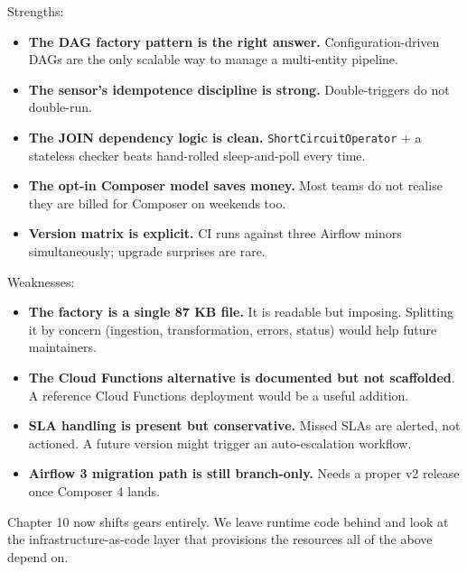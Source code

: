 \documentclass[
  11pt,
  british,
  oneside]{book}
\providecommand{\tightlist}{%
  \setlength{\itemsep}{0pt}\setlength{\parskip}{0pt}}
\begin{document}
Strengths:

\begin{itemize}
\tightlist
\item
  \textbf{The DAG factory pattern is the right answer.}
  Configuration-driven DAGs are the only scalable way to manage a
  multi-entity pipeline.
\item
  \textbf{The sensor's idempotence discipline is strong.}
  Double-triggers do not double-run.
\item
  \textbf{The JOIN dependency logic is clean.}
  \texttt{ShortCircuitOperator} + a stateless checker beats hand-rolled
  sleep-and-poll every time.
\item
  \textbf{The opt-in Composer model saves money.} Most teams do not
  realise they are billed for Composer on weekends too.
\item
  \textbf{Version matrix is explicit.} CI runs against three Airflow
  minors simultaneously; upgrade surprises are rare.
\end{itemize}

Weaknesses:

\begin{itemize}
\tightlist
\item
  \textbf{The factory is a single 87 KB file.} It is readable but
  imposing. Splitting it by concern (ingestion, transformation, errors,
  status) would help future maintainers.
\item
  \textbf{The Cloud Functions alternative is documented but not
  scaffolded}. A reference Cloud Functions deployment would be a useful
  addition.
\item
  \textbf{SLA handling is present but conservative.} Missed SLAs are
  alerted, not actioned. A future version might trigger an
  auto-escalation workflow.
\item
  \textbf{Airflow 3 migration path is still branch-only.} Needs a proper
  v2 release once Composer 4 lands.
\end{itemize}

Chapter 10 now shifts gears entirely. We leave runtime code behind and
look at the infrastructure-as-code layer that provisions the resources
all of the above depend on.
\end{document}
